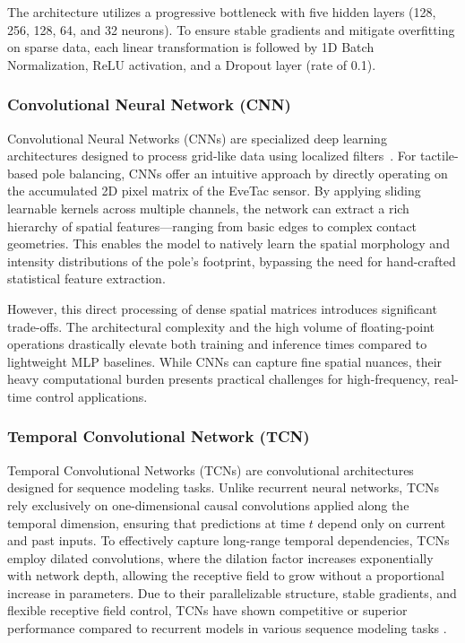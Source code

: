 \documentclass{article}
\begin{document}
The architecture utilizes a progressive bottleneck with five hidden layers (128, 256, 128, 64, and 32 neurons). To ensure stable gradients and mitigate overfitting on sparse data, each linear transformation is followed by 1D Batch Normalization, ReLU activation, and a Dropout layer (rate of 0.1).

\subsubsection{Convolutional Neural Network (CNN)}
Convolutional Neural Networks (CNNs) are specialized deep learning architectures designed to process grid-like data using localized filters~\cite{cnn}. For tactile-based pole balancing, CNNs offer an intuitive approach by directly operating on the accumulated 2D pixel matrix of the EveTac sensor. By applying sliding learnable kernels across multiple channels, the network can extract a rich hierarchy of spatial features—ranging from basic edges to complex contact geometries. This enables the model to natively learn the spatial morphology and intensity distributions of the pole's footprint, bypassing the need for hand-crafted statistical feature extraction.

However, this direct processing of dense spatial matrices introduces significant trade-offs. The architectural complexity and the high volume of floating-point operations drastically elevate both training and inference times compared to lightweight MLP baselines. While CNNs can capture fine spatial nuances, their heavy computational burden presents practical challenges for high-frequency, real-time control applications.
\subsubsection{Temporal Convolutional Network (TCN)}
Temporal Convolutional Networks (TCNs) are convolutional architectures
designed for sequence modeling tasks. Unlike recurrent neural networks, TCNs rely
exclusively on one-dimensional causal convolutions applied along the temporal dimension,
ensuring that predictions at time $t$ depend only on current and past inputs.
To effectively capture long-range temporal dependencies, TCNs employ dilated convolutions,
where the dilation factor increases exponentially with network depth, allowing the
receptive field to grow without a proportional increase in parameters.
Due to their parallelizable structure, stable gradients, and
flexible receptive field control, TCNs have shown competitive or superior performance
compared to recurrent models in various sequence modeling tasks \cite{bai2018empirical}.
\end{document}
